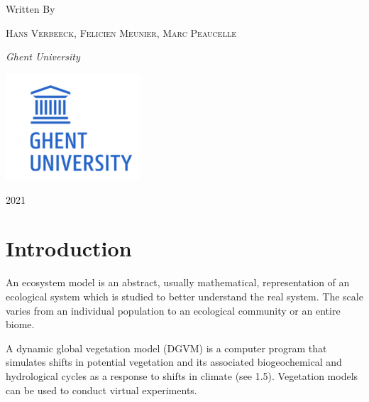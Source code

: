 \documentclass[12pt,oneside]{book}
\begin{document}
\begin{titlepage}
	Written By
	
	\vspace{0.5\baselineskip} %
	
	{\scshape Hans Verbeeck, Felicien Meunier, Marc Peaucelle \\} %
	
	\vspace{0.5\baselineskip} %
	
	\textit{Ghent University \\} %
	
	\vfill %
	
	
	
	\includegraphics[width = 50mm]{figures/UGhent2.png}
	
	\vspace{0.3\baselineskip} %
	
	2021 %
	

\end{titlepage}

{
\setcounter{tocdepth}{1}
\tableofcontents
}
\mainmatter

\chapter{Introduction}\label{intro}

An ecosystem model is an abstract, usually mathematical, representation
of an ecological system which is studied to better understand the real
system. The scale varies from an individual population to an ecological
community or an entire biome.

A dynamic global vegetation model (DGVM) is a computer program that
simulates shifts in potential vegetation and its associated
biogeochemical and hydrological cycles as a response to shifts in
climate (see 1.5). Vegetation models can be used to conduct virtual
experiments.
\end{document}

